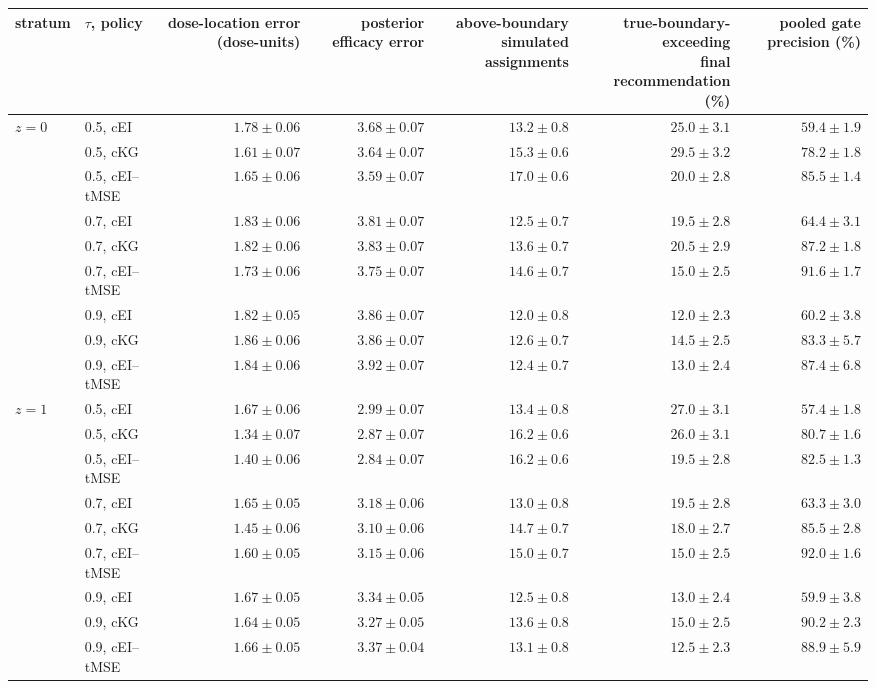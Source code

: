 \begin{tabular}{@{}llrrrrr@{}}
\toprule
stratum & $\tau$, policy & dose-location error (dose-units) & posterior efficacy error & \shortstack{above-boundary simulated\\assignments} & \shortstack{true-boundary-exceeding\\final recommendation (\%)} & pooled gate precision (\%) \\
\midrule
$z{=}0$ & 0.5, cEI & $1.78{\pm}0.06$ & $3.68{\pm}0.07$ & $13.2{\pm}0.8$ & $25.0{\pm}3.1$ & $59.4{\pm}1.9$ \\
 & 0.5, cKG & $1.61{\pm}0.07$ & $3.64{\pm}0.07$ & $15.3{\pm}0.6$ & $29.5{\pm}3.2$ & $78.2{\pm}1.8$ \\
 & 0.5, cEI--tMSE & $1.65{\pm}0.06$ & $3.59{\pm}0.07$ & $17.0{\pm}0.6$ & $20.0{\pm}2.8$ & $85.5{\pm}1.4$ \\
 & 0.7, cEI & $1.83{\pm}0.06$ & $3.81{\pm}0.07$ & $12.5{\pm}0.7$ & $19.5{\pm}2.8$ & $64.4{\pm}3.1$ \\
 & 0.7, cKG & $1.82{\pm}0.06$ & $3.83{\pm}0.07$ & $13.6{\pm}0.7$ & $20.5{\pm}2.9$ & $87.2{\pm}1.8$ \\
 & 0.7, cEI--tMSE & $1.73{\pm}0.06$ & $3.75{\pm}0.07$ & $14.6{\pm}0.7$ & $15.0{\pm}2.5$ & $91.6{\pm}1.7$ \\
 & 0.9, cEI & $1.82{\pm}0.05$ & $3.86{\pm}0.07$ & $12.0{\pm}0.8$ & $12.0{\pm}2.3$ & $60.2{\pm}3.8$ \\
 & 0.9, cKG & $1.86{\pm}0.06$ & $3.86{\pm}0.07$ & $12.6{\pm}0.7$ & $14.5{\pm}2.5$ & $83.3{\pm}5.7$ \\
 & 0.9, cEI--tMSE & $1.84{\pm}0.06$ & $3.92{\pm}0.07$ & $12.4{\pm}0.7$ & $13.0{\pm}2.4$ & $87.4{\pm}6.8$ \\
$z{=}1$ & 0.5, cEI & $1.67{\pm}0.06$ & $2.99{\pm}0.07$ & $13.4{\pm}0.8$ & $27.0{\pm}3.1$ & $57.4{\pm}1.8$ \\
 & 0.5, cKG & $1.34{\pm}0.07$ & $2.87{\pm}0.07$ & $16.2{\pm}0.6$ & $26.0{\pm}3.1$ & $80.7{\pm}1.6$ \\
 & 0.5, cEI--tMSE & $1.40{\pm}0.06$ & $2.84{\pm}0.07$ & $16.2{\pm}0.6$ & $19.5{\pm}2.8$ & $82.5{\pm}1.3$ \\
 & 0.7, cEI & $1.65{\pm}0.05$ & $3.18{\pm}0.06$ & $13.0{\pm}0.8$ & $19.5{\pm}2.8$ & $63.3{\pm}3.0$ \\
 & 0.7, cKG & $1.45{\pm}0.06$ & $3.10{\pm}0.06$ & $14.7{\pm}0.7$ & $18.0{\pm}2.7$ & $85.5{\pm}2.8$ \\
 & 0.7, cEI--tMSE & $1.60{\pm}0.05$ & $3.15{\pm}0.06$ & $15.0{\pm}0.7$ & $15.0{\pm}2.5$ & $92.0{\pm}1.6$ \\
 & 0.9, cEI & $1.67{\pm}0.05$ & $3.34{\pm}0.05$ & $12.5{\pm}0.8$ & $13.0{\pm}2.4$ & $59.9{\pm}3.8$ \\
 & 0.9, cKG & $1.64{\pm}0.05$ & $3.27{\pm}0.05$ & $13.6{\pm}0.8$ & $15.0{\pm}2.5$ & $90.2{\pm}2.3$ \\
 & 0.9, cEI--tMSE & $1.66{\pm}0.05$ & $3.37{\pm}0.04$ & $13.1{\pm}0.8$ & $12.5{\pm}2.3$ & $88.9{\pm}5.9$ \\
\bottomrule
\end{tabular}
